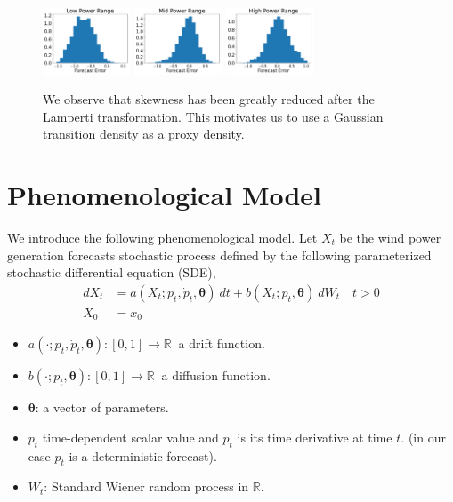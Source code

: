 \documentclass[10pt,twocolumn,letterpaper]{article}
\newcommand{\R}{\mathbb{R}}
\begin{document}
\begin{figure}
  \includegraphics[width=26mm,scale=1]{plots/hist_low_lamperti.pdf}
  \includegraphics[width=26mm,scale=1]{plots/hist_mid_lamperti.pdf}
  \includegraphics[width=26mm,scale=1]{plots/hist_high_lamperti.pdf}
  \caption{We observe that skewness has been greatly reduced after the Lamperti transformation. This motivates us to use a Gaussian transition density as a proxy density.}
  \label{fig:skew_after_lamperti}
\end{figure}

\section{Phenomenological  Model}
We introduce the following phenomenological model. Let $X_t$ be the  wind power generation forecasts stochastic process defined by the  following parameterized stochastic differential equation (SDE),
\begin{equation}
\begin{split}
dX_t &= a(X_t; p_t, \dot{p}_t,\bm{\theta}) \ dt + b (X_t;p_t, \bm{\theta} ) \ dW_t \quad t > 0 \\
X_0 & = x_0
\end{split}
\label{main}
\end{equation}

\begin{itemize}
\item $a(\cdot; p_t, \dot{p}_t,\bm{\theta}):[0,1] \to \R \ $  a drift function.
\item $b (\cdot;p_t, \bm{\theta} ):[0,1] \to \R \ $  a  diffusion function.
\item $\bm{\theta}$: a vector of parameters.
\item $p_t$ time-dependent scalar value and $ \dot{p}_t$ is its time derivative at time $t$. (in our case  $p_t$ is a deterministic forecast).
\item $W_t$: Standard Wiener random process in $\R$.
\end{itemize}
\end{document}
